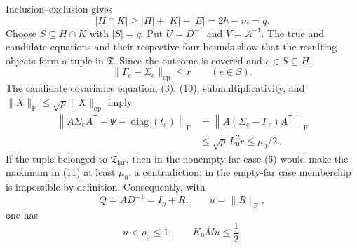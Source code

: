 Inclusion--exclusion gives
\[
|H\cap K|\geq|H|+|K|-|E|=2h-m=q.
\]
Choose \(S\subseteq H\cap K\) with \(|S|=q\). Put \(U=D^{-1}\) and \(V=A^{-1}\). The true and candidate equations and their respective four bounds show that the resulting objects form a tuple in \(\mathfrak T\). Since the outcome is covered and \(e\in S\subseteq H\),
\[
\|\Gamma_e-\Sigma_e\|_{\mathrm{op}}\leq r
\qquad(e\in S).
\tag{10}
\]
The candidate covariance equation, (3), (10), submultiplicativity, and \(\|X\|_{\mathrm F}\leq\sqrt p\|X\|_{\mathrm{op}}\) imply
\[
\begin{aligned}
\left\|A\Sigma_eA^{\mathsf T}
-\Psi-\operatorname{diag}(t_e)\right\|_{\mathrm F}
&=\left\|A(\Sigma_e-\Gamma_e)A^{\mathsf T}\right\|_{\mathrm F}\\
&\leq\sqrt p\,L_0^2r
\leq\mu_0/2.
\end{aligned}
\tag{11}
\]
If the tuple belonged to \(\mathfrak T_{\mathrm{far}}\), then in the nonempty-far case (6) would make the maximum in (11) at least \(\mu_0\), a contradiction; in the empty-far case membership is impossible by definition. Consequently, with
\[
Q=AD^{-1}=I_p+R,
\qquad u=\|R\|_{\mathrm F},
\]
one has
\[
u<\rho_0\leq1,
\qquad K_0\overline M u\leq\frac12.
\tag{12}
\]


